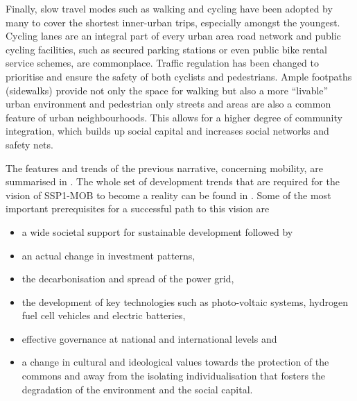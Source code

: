 {Finally, slow travel modes such as walking and cycling have been adopted by many to cover the shortest inner-urban trips, especially amongst the youngest. Cycling lanes are an integral part of every urban area road network and public cycling facilities, such as secured parking stations or even public bike rental service schemes, are commonplace. Traffic regulation has been changed to prioritise and ensure the safety of both cyclists and pedestrians. Ample footpaths (sidewalks) provide not only the space for walking but also a more ``livable'' urban environment and pedestrian only streets and areas are also a common feature of urban neighbourhoods. This allows for a higher degree of community integration, which builds up social capital and increases social networks and safety nets.
}

The features and trends of the previous narrative, concerning mobility, are summarised in . The whole set of development trends that are required for the vision of SSP1-MOB to become a reality can be found in \textcite{vuuren2017_Energylanduse,oneill2017_roadsaheadNarratives}. Some of the most important prerequisites for a successful path to this vision are
%
\begin{itemize}
\item a wide societal support for sustainable development followed by
\item an actual change in investment patterns,
\item the decarbonisation and spread of the power grid,
\item the development of key technologies such as photo-voltaic systems, hydrogen fuel cell vehicles and electric batteries,
\item effective governance at national and international levels and
\item a change in cultural and ideological values towards the protection of the commons and away from the isolating individualisation that fosters the degradation of the environment and the social capital.
\end{itemize}
%
